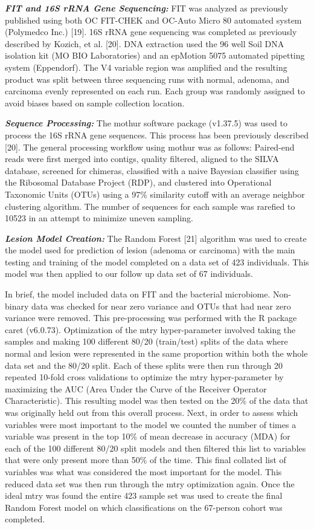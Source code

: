\documentclass[12pt,]{article}
\begin{document}
\textbf{\emph{FIT and 16S rRNA Gene Sequencing:}} FIT was analyzed as
previously published using both OC FIT-CHEK and OC-Auto Micro 80
automated system (Polymedco Inc.) {[}19{]}. 16S rRNA gene sequencing was
completed as previously described by Kozich, et al. {[}20{]}. DNA
extraction used the 96 well Soil DNA isolation kit (MO BIO Laboratories)
and an epMotion 5075 automated pipetting system (Eppendorf). The V4
variable region was amplified and the resulting product was split
between three sequencing runs with normal, adenoma, and carcinoma evenly
represented on each run. Each group was randomly assigned to avoid
biases based on sample collection location.

\textbf{\emph{Sequence Processing:}} The mothur software package
(v1.37.5) was used to process the 16S rRNA gene sequences. This process
has been previously described {[}20{]}. The general processing workflow
using mothur was as follows: Paired-end reads were first merged into
contigs, quality filtered, aligned to the SILVA database, screened for
chimeras, classified with a naive Bayesian classifier using the
Ribosomal Database Project (RDP), and clustered into Operational
Taxonomic Units (OTUs) using a 97\% similarity cutoff with an average
neighbor clustering algorithm. The number of sequences for each sample
was rarefied to 10523 in an attempt to minimize uneven sampling.

\textbf{\emph{Lesion Model Creation:}} The Random Forest {[}21{]}
algorithm was used to create the model used for prediction of lesion
(adenoma or carcinoma) with the main testing and training of the model
completed on a data set of 423 individuals. This model was then applied
to our follow up data set of 67 individuals.

In brief, the model included data on FIT and the bacterial microbiome.
Non-binary data was checked for near zero variance and OTUs that had
near zero variance were removed. This pre-processing was performed with
the R package caret (v6.0.73). Optimization of the mtry hyper-parameter
involved taking the samples and making 100 different 80/20 (train/test)
splits of the data where normal and lesion were represented in the same
proportion within both the whole data set and the 80/20 split. Each of
these splits were then run through 20 repeated 10-fold cross validations
to optimize the mtry hyper-parameter by maximizing the AUC (Area Under
the Curve of the Receiver Operator Characteristic). This resulting model
was then tested on the 20\% of the data that was originally held out
from this overall process. Next, in order to assess which variables were
most important to the model we counted the number of times a variable
was present in the top 10\% of mean decrease in accuracy (MDA) for each
of the 100 different 80/20 split models and then filtered this list to
variables that were only present more than 50\% of the time. This final
collated list of variables was what was considered the most important
for the model. This reduced data set was then run through the mtry
optimization again. Once the ideal mtry was found the entire 423 sample
set was used to create the final Random Forest model on which
classifications on the 67-person cohort was completed.
\end{document}

